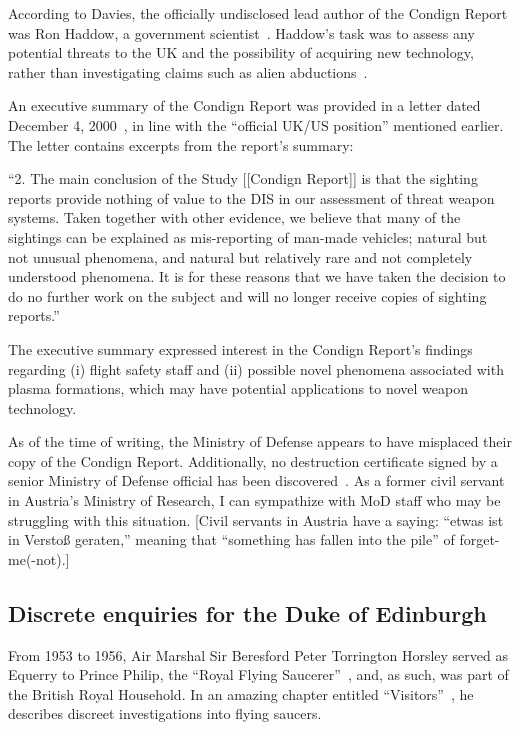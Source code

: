 According to Davies, the officially undisclosed lead author of the Condign Report was Ron Haddow, a government scientist~\cite{Clarke2022Nov}. Haddow's task was to assess any potential threats to the UK and the possibility of acquiring new technology, rather than investigating claims such as alien abductions~\cite{BibEntry2018May}.

An executive summary of the Condign Report was provided in a letter dated December 4, 2000~\cite{Clarke2022Oct}, in line with the ``official UK/US position'' mentioned earlier. The letter contains excerpts from the report's summary:
\begin{svgraybox}
``2. The main conclusion of the Study [[Condign Report]] is that the sighting reports provide nothing of value to the
DIS in our assessment of threat weapon systems. Taken together with other evidence, we believe that
many of the sightings can be explained as mis-reporting of man-made vehicles; natural but not
unusual phenomena, and natural but relatively rare and not completely understood phenomena. It is
for these reasons that we have taken the decision to do no further work on the subject and will no
longer receive copies of sighting reports.''
\end{svgraybox}
The executive summary expressed interest in the Condign Report's findings regarding (i) flight safety staff and (ii) possible novel phenomena associated with plasma formations, which may have potential applications to novel weapon technology.

As of the time of writing, the Ministry of Defense appears to have misplaced their copy of the Condign Report. Additionally, no destruction certificate signed by a senior Ministry of Defense official has been discovered~\cite{Clarke2022Nov}. As a former civil servant in Austria's Ministry of Research, I can sympathize with MoD staff who may be struggling with this situation.
[Civil servants in Austria have a saying: ``etwas ist in Versto{\ss} geraten,'' meaning that
``something has fallen into the pile'' of forget-me(-not).]

\subsection{Discrete enquiries for the Duke of Edinburgh}
\label{2023-UFO-part-Perception-types-UK-dede}

From 1953 to 1956, Air Marshal Sir Beresford Peter Torrington Horsley served as Equerry to Prince Philip, the ``Royal Flying Saucerer''~\cite{Clarke-Philip-TRFS}, and, as such, was part of the British Royal Household.
In an amazing chapter entitled ``Visitors''~\cite[Chapter~10]{Horsley1998Jan}, he describes discreet investigations into flying saucers.

